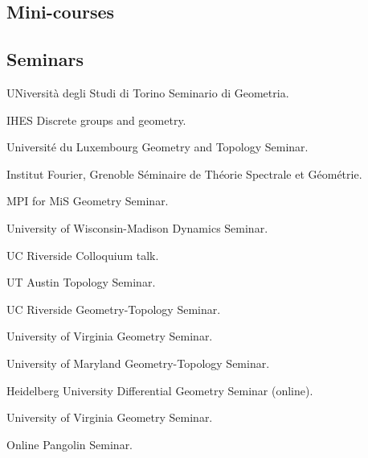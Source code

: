 
\subsection{Mini-courses}


\subsection{Seminars}

{UNiversit\`a degli Studi di Torino}
{Seminario di Geometria.}
{}

{IHES}
{Discrete groups and geometry.}
{}

{Universit\'e du Luxembourg}
{Geometry and Topology Seminar.}
{}

{Institut Fourier, Grenoble}
{S\'eminaire de Th\'eorie Spectrale et G\'eom\'etrie.}
{}

{MPI for MiS}
{Geometry Seminar.}
{}

{University of Wisconsin-Madison}
{Dynamics Seminar.}
{}

{UC Riverside}
{Colloquium talk.}
{}

{UT Austin}
{Topology Seminar.}
{}

{UC Riverside}
{Geometry-Topology Seminar.}
{}

{University of Virginia}
{Geometry Seminar.}
{}

{University of Maryland}
{Geometry-Topology Seminar.}
{}

{Heidelberg University}
{Differential Geometry Seminar (online).}
{}

{University of Virginia}
{Geometry Seminar.}
{}

{Online}
{Pangolin Seminar.}
{}


